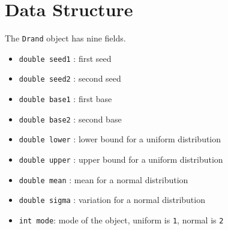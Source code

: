 \par
\section{Data Structure}
\label{section:Drand:dataStructure}
\par
The {\tt Drand} object has nine fields.
\begin{itemize}
\item 
{\tt double seed1} : first seed
\item 
{\tt double seed2} : second seed
\item 
{\tt double base1} : first base
\item 
{\tt double base2} : second base
\item 
{\tt double lower} : lower bound for a uniform distribution
\item 
{\tt double upper} : upper bound for a uniform distribution
\item 
{\tt double mean} : mean for a normal distribution
\item 
{\tt double sigma} : variation for a normal distribution
\item 
{\tt int mode}: 
mode of the object, uniform is {\tt 1}, normal is {\tt 2}
\end{itemize}
